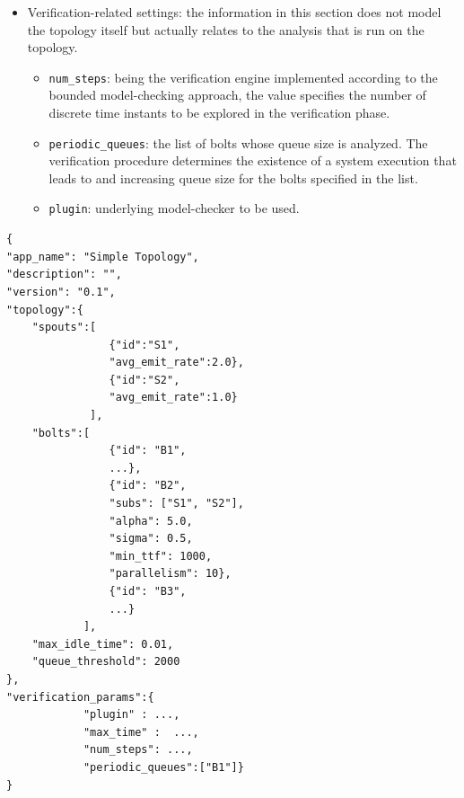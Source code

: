 {\begin{itemize}
\begin{itemize}
		\item \texttt{max\_idle\_time}: the maximum time for a bolt to be inactive.
	\end{itemize}
	\item Verification-related settings: the information in this section does not model the topology itself but actually relates to the analysis that is run on the topology. 
	\begin{itemize}
		\item \texttt{num\_steps}: being the verification engine implemented according to the bounded model-checking approach, the value specifies the number of discrete time instants to be explored in the verification phase.
		\item \texttt{periodic\_queues}: the list of bolts whose queue size is analyzed. The verification procedure determines the existence of a system execution that leads to and increasing queue size for the bolts specified in the list.	
		\item \texttt{plugin}: underlying model-checker to be used.
	\end{itemize}
\end{itemize}

\begin{lstlisting}[basicstyle=\normalfont\ttfamily\small,tabsize=12,caption=Example JSON file describing a simple topology. Dots are used for the sake of clarity and conciseness and numbers are casual.]
{
"app_name": "Simple Topology",
"description": "",
"version": "0.1",
"topology":{
	"spouts":[
	            {"id":"S1",
	            "avg_emit_rate":2.0},
	            {"id":"S2",
	            "avg_emit_rate":1.0}
	         ],
	"bolts":[
	            {"id": "B1",
	            ...},
	            {"id": "B2",
	            "subs": ["S1", "S2"],
	            "alpha": 5.0,
	            "sigma": 0.5,
	            "min_ttf": 1000,
	            "parallelism": 10},
	            {"id": "B3",
	            ...}
	        ],
	"max_idle_time": 0.01,
	"queue_threshold": 2000
},
"verification_params":{
            "plugin" : ...,
            "max_time" :  ...,
            "num_steps": ...,
            "periodic_queues":["B1"]}
}
\end{lstlisting}\label{lst:json-format}
}
